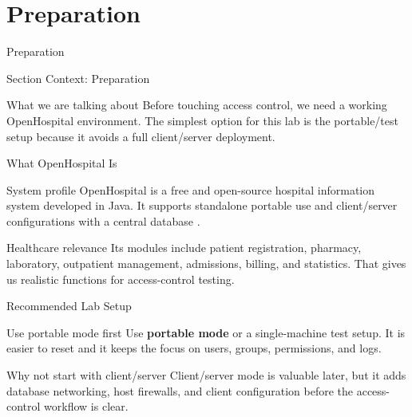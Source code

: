 \documentclass[presentation]{beamer}
\newcommand{\sectiontitleframe}[1]{
\begin{frame}[plain,c]
\begin{center}
{\usebeamerfont{title}\usebeamercolor[fg]{title}#1}
\end{center}
\end{frame}
}
\begin{document}
\section{Preparation}
\sectiontitleframe{Preparation}

\begin{frame}[c]{Section Context: Preparation}
\begin{block}{What we are talking about}
Before touching access control, we need a working OpenHospital environment. The simplest option for
this lab is the portable/test setup because it avoids a full client/server deployment.
\end{block}
\end{frame}

\begin{frame}[c]{What OpenHospital Is}
\begin{block}{System profile}
OpenHospital is a free and open-source hospital information system developed in Java. It supports
standalone portable use and client/server configurations with a central database
\cite{openhospital_admin}.
\end{block}

\begin{exampleblock}{Healthcare relevance}
Its modules include patient registration, pharmacy, laboratory, outpatient management, admissions,
billing, and statistics. That gives us realistic functions for access-control testing.
\end{exampleblock}
\end{frame}

\begin{frame}[c]{Recommended Lab Setup}
\begin{block}{Use portable mode first}
Use \textbf{portable mode} or a single-machine test setup. It is easier to reset and it keeps the
focus on users, groups, permissions, and logs.
\end{block}

\begin{exampleblock}{Why not start with client/server}
Client/server mode is valuable later, but it adds database networking, host firewalls, and client
configuration before the access-control workflow is clear.
\end{exampleblock}
\end{frame}
\end{document}
